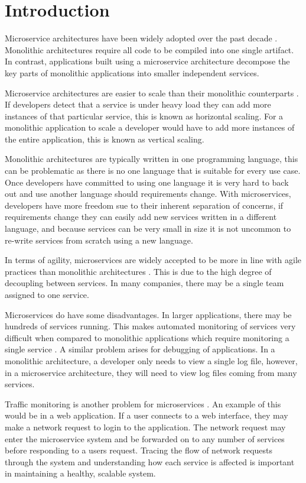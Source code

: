 \chapter{Introduction}

Microservice architectures have been widely adopted over the past decade \cite{7030212}. Monolithic architectures require all code to be compiled into one single artifact. In contrast, applications built using a microservice architecture decompose the key parts of monolithic applications into smaller independent services. 

Microservice architectures are easier to scale than their monolithic counterparts \cite{namiot2014micro}. If developers detect that a service is under heavy load they can add more instances of that particular service, this is known as horizontal scaling. For a monolithic application to scale a developer would have to add more instances of the entire application, this is known as vertical scaling. 

Monolithic architectures are typically written in one programming language, this can be problematic as there is no one language that is suitable for every use case. Once developers have committed to using one language it is very hard to back out and use another language should requirements change. With microservices, developers have more freedom sue to their inherent separation of concerns, if requirements change they can easily add new services written in a different language, and because services can be very small in size it is not uncommon to re-write services from scratch using a new language.

In terms of agility, microservices are widely accepted to be more in line with agile practices than monolithic architectures \cite{larrucea2018microservices}. This is due to the high degree of decoupling between services. In many companies, there may be a single team assigned to one service.

Microservices do have some disadvantages. In larger applications, there may be hundreds of services running. This makes automated monitoring of services very difficult when compared to monolithic applications which require monitoring a single service \cite{mayer2017dashboard}. A similar problem arises for debugging of applications. In a monolithic architecture, a developer only needs to view a single log file, however, in a microservice architecture, they will need to view log files coming from many services. 

Traffic monitoring is another problem for microservices \cite{sun2015security}. An example of this would be in a web application. If a user connects to a web interface, they may make a network request to login to the application. The network request may enter the microservice system and be forwarded on to any number of services before responding to a users request. Tracing the flow of network requests through the system and understanding how each service is affected is important in maintaining a healthy, scalable system. 

